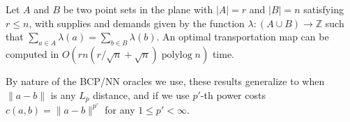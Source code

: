 \documentclass[a4paper,UKenglish]{socg-lipics-v2018}
\def\polylog{\mathop{\mathrm{polylog}}}
\def\ints{\mathbb{Z}}
\def\norm#1{\mathopen\| #1 \mathclose\|}	%
\def\tsupply{\lambda}
\theoremstyle{plain}
\numberwithin{figure}{section}
\begin{document}
\begin{theorem}
\label{theorem:orlin}
Let $A$ and $B$ be two point sets in the plane with $|A| = r$ and $|B| = n$
satisfying $r \le n$, with supplies and demands given by the function
$\tsupply: (A \cup B) \to \ints$ such that
$\sum_{a \in A} \tsupply(a) = \sum_{b \in B} \tsupply(b)$.
An optimal transportation map can be computed in
$O(rn(r/\sqrt{n} + \sqrt{n})\polylog n)$ time.
\end{theorem}



By nature of the BCP/NN oracles we use, these results generalize to when
$\norm{a-b}$ is any $L_p$ distance, and if we use $p'$-th power costs
$c(a, b) = \norm{a-b}^{p'}$ for any $1 \le p' < \infty$.
\end{document}
